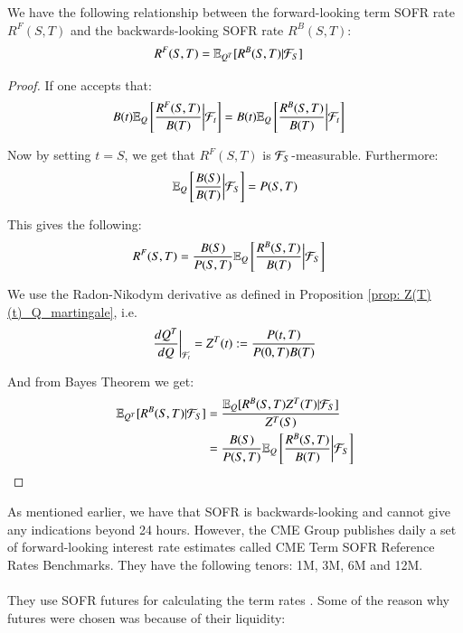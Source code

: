 \begin{proposition}
We have the following relationship between the forward-looking term SOFR rate $R^{F}(S,T)$ and the backwards-looking SOFR rate $R^{B}(S,T)$: 
\begin{align*}
R^{F}(S,T) &= \mathbb{E}_{Q^{T}}[R^{B}(S,T)|\mathcal{F}_{S}]    
\end{align*}
\end{proposition}

\begin{proof}

If one accepts that: 
\begin{align*}
B(t)\mathbb{E}_{Q}\left[
\frac{R^{F}(S,T)}{B(T)}
\bigg{|}\mathcal{F}_{t}\right]
&= 
B(t)\mathbb{E}_{Q}\left[
\frac{R^{B}(S,T)}{B(T)}\bigg{|}\mathcal{F}_{t}
\right]
\end{align*}

Now by setting $t=S$, we get that $R^{F}(S,T)$ is $\mathcal{F}_{S}$-measurable. Furthermore:
\[
\mathbb{E}_{Q}\left[
\frac{B(S)}{B(T)}\bigg{|}\mathcal{F}_{S}
\right] = P(S,T)
\]

This gives the following: 
\begin{align*}
R^{F}(S,T) &= \frac{B(S)}{P(S,T)}\mathbb{E}_{Q}\left[
\frac{R^{B}(S,T)}{B(T)}\bigg{|}\mathcal{F}_{S}
\right]
\end{align*} 

We use the Radon-Nikodym derivative as defined in Proposition \ref{prop: Z(T)(t)_Q_martingale}, i.e. 
\[
\frac{dQ^{T}}{dQ}\bigg{|}_{\mathcal{F}_{t}} = Z^{T}(t):= \frac{P(t,T)}{P(0,T)B(T)}
\]

And from Bayes Theorem we get: 
\begin{align*}
\mathbb{E}_{Q^{T}}[R^{B}(S,T)|\mathcal{F}_{S}] &= 
\frac{
\mathbb{E}_{Q}[R^{B}(S,T)Z^{T}(T)|\mathcal{F}_{S}]
}{Z^{T}(S)} \\ 
&= 
\frac{B(S)}{P(S,T)}\mathbb{E}_{Q}\left[
\frac{R^{B}(S,T)}{B(T)}\bigg{|}\mathcal{F}_{S}
\right]
\end{align*}

\end{proof}


\newpage 

As mentioned earlier, we have that SOFR is backwards-looking and cannot give any indications beyond 24 hours. However, the CME Group publishes daily a set of forward-looking interest rate estimates called CME Term SOFR Reference Rates Benchmarks. 
They have the following tenors: 1M, 3M, 6M and 12M. \cite{CMEGroup}
\\~\\ 
They use SOFR futures for calculating the term rates \cite{CMEGroup}. Some of the reason why futures were chosen was because of their liquidity: 

